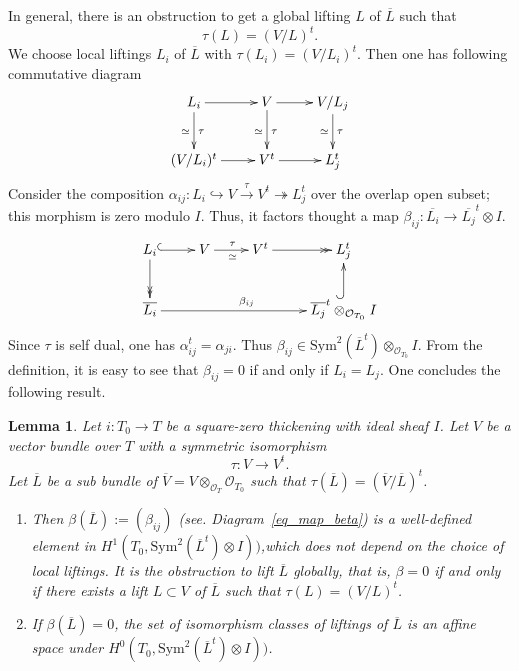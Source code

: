 \documentclass[12pt,twoside]{book}
\theoremstyle{plain}
\newtheorem{lemma}[lemma]{Lemma}
\theoremstyle{definition}
\theoremstyle{remark}
\numberwithin{equation}{section}
\begin{document}
In general, there is an obstruction to get a global lifting $L$ of $\overline{L}$ such that
\[\tau(L)=(V/L)^t.\]
We choose local liftings $L_i$ of $\overline{L}$ with $\tau(L_i)=(V/L_i)^t$. Then one has following commutative diagram
\begin{equation*}
\xymatrix{
L_i \ar[r] \ar[d]^{\tau}_{\simeq} & V \ar[r] \ar[d]^{\tau}_{\simeq} & V/L_j \ar[d]^{\tau}_{\simeq}\\
(V/L_i)^t \ar[r] & V^t \ar[r] & L_j^t \\
}
\end{equation*}
Consider the composition $\alpha_{ij}\colon L_i \hookrightarrow V \xrightarrow{\tau} V^t \twoheadrightarrow L_j^t$ over the overlap open subset; this morphism is zero modulo $I$. Thus, it factors thought a map $\beta_{ij}: \overline{L_i} \rightarrow \overline{L_j}^t \otimes I$.
\begin{equation}
\label{eq_map_beta}
\xymatrix{L_i \ar@{->>}[d] \ar@{^(->}[r] & V \ar[r]^{\tau}_{\simeq} & V^t \ar@{->>}[r] & L_j^t\\
\overline{L_i} \ar[rrr]^{\beta_{ij}} &&& \overline{L_j}^t \otimes_{\mathcal O_{T_0}} I \ar@{^(->}[u]\\}
\end{equation}
Since $\tau$ is self dual, one has $\alpha_{ij}^t=\alpha_{ji}$. Thus $\beta_{ij}\in \mathrm{Sym}^2(\overline{L}^t)\otimes_{\mathcal O_{T_0}}I$.
From the definition, it is easy to see that $\beta_{ij}=0$ if and only if $L_i=L_j$. One concludes the following result.
\begin{lemma}
\label{obs:fil}
Let $i:T_0\rightarrow T$ be a square-zero thickening with ideal sheaf $I$. Let $V$ be a vector bundle over $T$ with a symmetric isomorphism
\[\tau\colon V\rightarrow V^t.\]
Let $\overline{L}$ be a sub bundle of $\overline{V}=V\otimes_{\mathcal O_T} \mathcal O_{T_0}$ such that $\tau(\overline{L})=(\overline{V}/\overline{L})^t$.
\begin{enumerate}
\item [i).]
Then $\beta(\overline{L}):=(\beta_{ij})$ (see. Diagram~\eqref{eq_map_beta}) is a well-defined element in $H^1(T_0,\mathrm{Sym}^2(\overline{L}^t)\otimes I))$,which does not depend on the choice of local liftings. It is the obstruction to lift $\overline{L}$ globally, that is, $\beta=0$ if and only if there exists a lift $L\subset V$ of $\overline{L}$ such that $\tau(L)=(V/L)^t$.
\item [ii).]
If $\beta(\overline{L})=0$, the set of isomorphism classes of liftings of $\overline{L}$ is an affine space under $H^0(T_0,\mathrm{Sym}^2(\overline{L}^t)\otimes I))$.
\end{enumerate}
\end{lemma}
\end{document}
